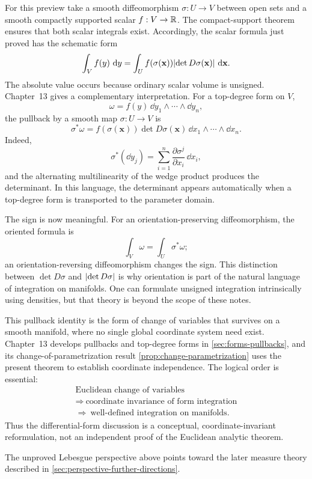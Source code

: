 For this preview take a smooth diffeomorphism $\sigma:U\to V$ between
open sets and a smooth compactly supported scalar $f:V\to\mathbb{R}$.
The compact-support theorem ensures that both scalar integrals exist.
Accordingly, the scalar formula just proved has the schematic form
\[
\int_V f(y)\,\mathop{}\!\mathrm{d} y
=
\int_U f(\sigma(\mathbf{x}))\lvert \det D\sigma(\mathbf{x})\rvert\,\mathop{}\!\mathrm{d}\mathbf{x}.
\]
The absolute value occurs because ordinary scalar volume is unsigned.
Chapter~13 gives a complementary interpretation.  For a top-degree form on
\(V\),
\[
\omega=f(y)\,\dd y_1\wedge\cdots\wedge\dd y_n,
\]
the pullback by a smooth map \(\sigma:U\to V\) is
\[
\sigma^*\omega
=
f(\sigma(\mathbf{x}))\det D\sigma(\mathbf{x})\,
\dd x_1\wedge\cdots\wedge\dd x_n.
\]
Indeed,
\[
\sigma^*(\dd y_j)
=
\sum_{i=1}^{n}
\frac{\partial\sigma^j}{\partial x_i}\,\dd x_i,
\]
and the alternating multilinearity of the wedge product produces the
determinant.  In this language, the determinant appears automatically when a
top-degree form is transported to the parameter domain.

The sign is now meaningful.  For an orientation-preserving diffeomorphism,
the oriented formula is
\[
\int_V\omega=\int_U\sigma^*\omega;
\]
an orientation-reversing diffeomorphism changes the sign.  This distinction
between \(\det D\sigma\) and \(\lvert \det D\sigma\rvert\) is why orientation is part of
the natural language of integration on manifolds.  One can formulate
unsigned integration intrinsically using densities, but that theory is beyond
the scope of these notes.

This pullback identity is the form of change of variables that survives on a
smooth manifold, where no single global coordinate system need exist.
Chapter~13 develops pullbacks and top-degree forms in
\cref{sec:forms-pullbacks}, and its change-of-parametrization result
\cref{prop:change-parametrization} uses the present theorem to establish
coordinate independence.  The logical order is essential:
\[
\begin{gathered}
\text{Euclidean change of variables}\\
\Longrightarrow\ \text{coordinate invariance of form integration}\\
\Longrightarrow\ \text{well-defined integration on manifolds}.
\end{gathered}
\]
Thus the differential-form discussion is a conceptual,
coordinate-invariant reformulation, not an independent proof of the
Euclidean analytic theorem.

The unproved Lebesgue perspective above points toward the later measure
theory described in \cref{sec:perspective-further-directions}.

